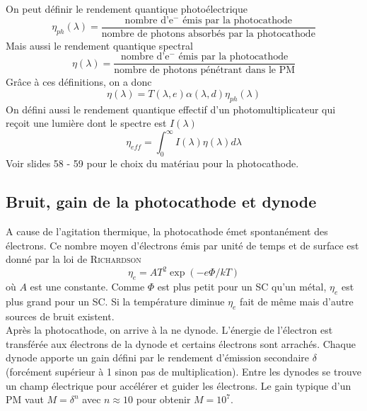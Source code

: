 On peut définir le rendement quantique photoélectrique
\begin{equation}
\eta_{ph}(\lambda)=\frac{\mbox{nombre d'e$^-$ \'emis par la photocathode}}{\mbox{nombre de photons absorb\'es par la photocathode}}
\end{equation}
Mais aussi le rendement quantique spectral
\begin{equation}
\eta(\lambda)=\frac{\mbox{nombre d'e$^-$ \'emis par la photocathode}}{\mbox{nombre de photons p\'en\'etrant dans le PM}}
\end{equation}
Grâce à ces définitions, on a donc
\begin{equation}
\eta(\lambda)=T(\lambda,e)\alpha(\lambda,d)\eta_{ph}(\lambda)
\end{equation}
On défini aussi le rendement quantique effectif d'un photomultiplicateur qui reçoit une lumière dont
le spectre est $I(\lambda)$
\begin{equation}
\eta_{eff}=\int_0^\infty I(\lambda)\eta(\lambda)d\lambda
\end{equation}
Voir slides 58 - 59 pour le choix du matériau pour la photocathode.

\subsection{Bruit, gain de la photocathode et dynode}
A cause de l'agitation thermique, la photocathode émet spontanément des électrons. Ce nombre moyen
d'électrons émis par unité de temps et de surface est donné par la loi de \textsc{Richardson}
\begin{equation}
\eta_e=AT^2\exp{(-e\Phi/kT)}
\end{equation}
où $A$ est une constante. Comme $\Phi$ est plus petit pour un SC qu'un métal, $\eta_e$ est 
plus grand pour un SC. Si la température diminue $\eta_e$ fait de même mais d'autre sources de
bruit existent.\\

Après la photocathode, on arrive à la ne dynode. L'énergie de l'électron est transférée aux électrons
de la dynode et certains électrons sont arrachés. Chaque dynode apporte un gain défini par le 
rendement d'émission secondaire $\delta$ (forcément supérieur à 1 sinon pas de multiplication). Entre
les dynodes se trouve un champ électrique pour accélérer et guider les électrons. Le gain 
typique d'un PM vaut $M=\delta^n$ avec $n\approx10$ pour obtenir $M=10^7$. \\

